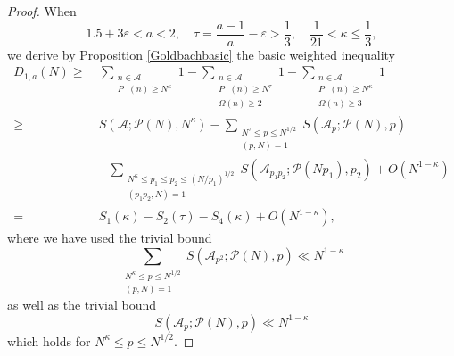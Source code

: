 \documentclass[12pt, a4paper]{amsart}
\def \P {{\mathbb P}}
\def\le{\leqslant}
\def\ge{\geqslant}
\theoremstyle{plain}
\theoremstyle{remark}
\numberwithin{equation}{section}
\begin{document}
\begin{proof}
When 	
$$
1.5+3\varepsilon<a<2,\quad \tau=\dfrac{a-1}{a}-\varepsilon>\frac{1}{3}, \quad \frac{1}{21}<\kappa\le \frac{1}{3}, 
$$
we derive by Proposition \ref{Goldbachbasic} the basic weighted inequality
\begin{equation}\label{Goldbachw1}
\begin{split}
D_{1,a}(N)\ge\ & \sum\limits_{\substack{n\in \mathscr{A}\\P^{-}(n)\ge N^\kappa}}1-\sum\limits_{\substack{n\in \mathscr{A}\\P^{-}(n)\ge N^\tau\\ \Omega(n)\ge 2}}1-\sum\limits_{\substack{n\in \mathscr{A}\\P^{-}(n)\ge N^\kappa\\\Omega(n)\ge 3}}1\\
\ge\ & S(\mathscr{A};\mathscr{P}(N),N^\kappa)-\sum\limits_{\substack{N^\tau\le p\le N^{1/2} \\(p, N)=1}}S(\mathscr{A}_p ; \mathscr{P}(N), p)\\
&-\sum_{\substack{N^\kappa \le p_1 \le p_2 \le (N/p_1)^{1/2} \\ (p_1 p_2, N) = 1}}  
S(\mathscr{A}_{p_1 p_2}; \mathscr{P}(N p_1), p_2)+O(N^{1-\kappa})\\
=\ & S_1(\kappa)-S_2(\tau)-S_4(\kappa)+O(N^{1-\kappa}),
\end{split}	
\end{equation}
where we have used the trivial bound 
\begin{equation}\label{Buchstab1}
\sum_{\substack{N^\kappa \le p \le N^{1/2} \\ (p, N) = 1}} S(\mathscr{A}_{p^2} ; \mathscr{P}(N), p) 
\ll N^{1-\kappa} 
\end{equation}
as well as the trivial bound 
\begin{equation}\label{Buchstab0} 
S(\mathscr{A}_{p} ; \mathscr{P}(N), p) \ll N^{1-\kappa}
\end{equation}
which holds for $N^{\kappa}\le p\le  N^{1/2}$. 
		

\end{proof}
\end{document}
